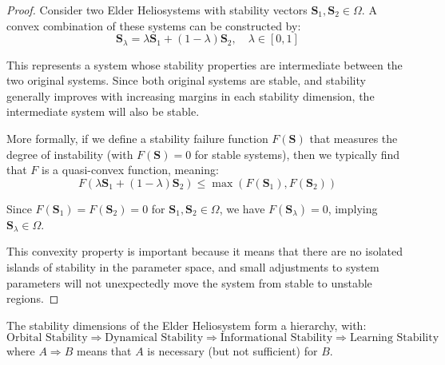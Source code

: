 \begin{proof}
Consider two Elder Heliosystems with stability vectors $\mathbf{S}_1, \mathbf{S}_2 \in \Omega$. A convex combination of these systems can be constructed by:
\begin{equation}
\mathbf{S}_{\lambda} = \lambda \mathbf{S}_1 + (1-\lambda) \mathbf{S}_2, \quad \lambda \in [0,1]
\end{equation}

This represents a system whose stability properties are intermediate between the two original systems. Since both original systems are stable, and stability generally improves with increasing margins in each stability dimension, the intermediate system will also be stable.

More formally, if we define a stability failure function $F(\mathbf{S})$ that measures the degree of instability (with $F(\mathbf{S}) = 0$ for stable systems), then we typically find that $F$ is a quasi-convex function, meaning:
\begin{equation}
F(\lambda \mathbf{S}_1 + (1-\lambda) \mathbf{S}_2) \leq \max(F(\mathbf{S}_1), F(\mathbf{S}_2))
\end{equation}

Since $F(\mathbf{S}_1) = F(\mathbf{S}_2) = 0$ for $\mathbf{S}_1, \mathbf{S}_2 \in \Omega$, we have $F(\mathbf{S}_{\lambda}) = 0$, implying $\mathbf{S}_{\lambda} \in \Omega$.

This convexity property is important because it means that there are no isolated islands of stability in the parameter space, and small adjustments to system parameters will not unexpectedly move the system from stable to unstable regions.
\end{proof}

\begin{theorem}
The stability dimensions of the Elder Heliosystem form a hierarchy, with:
\begin{equation}
\text{Orbital Stability} \Rightarrow \text{Dynamical Stability} \Rightarrow \text{Informational Stability} \Rightarrow \text{Learning Stability}
\end{equation}
where $A \Rightarrow B$ means that $A$ is necessary (but not sufficient) for $B$.
\end{theorem}

